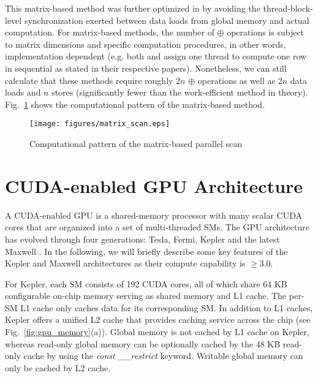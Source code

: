 \documentclass[article]{elsarticle}
\renewcommand{\hl}[1]{#1}
\begin{document}
{This matrix-based method was further optimized in \cite{yan2013streamscan} by avoiding the thread-block-level synchronization exerted between data loads from global memory and actual computation. For matrix-based methods, the number of $\oplus$ operations is subject to matrix dimensions and specific computation procedures, in other words, implementation dependent (e.g. both \cite{dotsenko2008fast}  and \cite{yan2013streamscan} assign one thread to compute one row in sequential \hl{as stated in their respective papers}). Nonetheless, we can still calculate that these methods require roughly $2n$ $\oplus$ operations as well as $2n$ data loads and $n$ stores (significantly fewer than the work-efficient method in theory). Fig.~\ref{fig:matrix_scan} shows the computational pattern of the matrix-based method.
\begin{figure}[!h]
\centering
\texttt{[image: figures/matrix\_scan.eps]}
\caption{Computational pattern of the matrix-based parallel scan}
\label{fig:matrix_scan}
\end{figure}
\section{CUDA-enabled GPU Architecture}
A CUDA-enabled GPU is a shared-memory processor with many scalar CUDA cores that are organized into a set of multi-threaded SMs. The GPU architecture has evolved through four generations: Tesla, Fermi, Kepler \cite{kepler} and the latest Maxwell \cite{maxwell}. In the following, we will briefly describe some key features of the Kepler and Maxwell architectures as their compute capability is $\geq 3.0$.

For Kepler, each SM consists of 192 CUDA cores, all of which share 64 KB configurable on-chip memory serving as shared memory and L1 cache. The per-SM L1 cache only caches data for its corresponding SM. In addition to L1 caches, Kepler offers a unified L2 cache that provides caching service across the chip (see Fig.~\ref{fig:gpu_memory}(a)). Global memory is not cached by L1 cache on Kepler, whereas read-only global memory can be optionally cached by the 48 KB read-only cache by using the \textit{const \_\_restrict} keyword. Writable global memory can only be cached by L2 cache.

}
\end{document}
